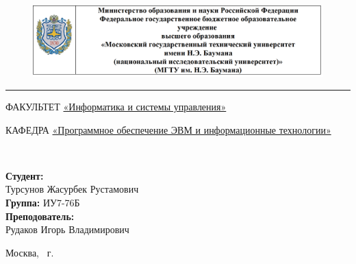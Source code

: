 \documentclass[a4paper, 12pt]{article}
\begin{document}
	
\begin{titlepage}
	\fontsize{12pt}{12pt}\selectfont
	\begin{figure}[t!]
		\centering
		\includegraphics[scale=0.8]{bmstu}
	\end{figure}
	
	\noindent\rule{15cm}{3pt}
	\newline\newline
	\noindent 
	ФАКУЛЬТЕТ 
	\underline{«Информатика и системы управления»} \newline
	
	\noindent КАФЕДРА \underline{«Программное обеспечение ЭВМ и информационные технологии»}\newline\newline\newline\newline\newline
	
	\vspace{4mm}
	
	\\ 
	\vspace{20mm}
	
	
	\begin{flushright}
		{\small	\textbf{Студент:}\\ Турсунов Жасурбек Рустамович \\ \textbf{Группа:} ИУ7-76Б
			\vspace{3mm}
			\\\textbf{Преподователь:} \\ Рудаков Игорь Владимирович }
	\end{flushright}
	
	\begin{center}
		\vfill
		Москва, \the\year
		~г.
	\end{center}
\end{titlepage}

\tableofcontents
\clearpage
\newpage
\end{document}
